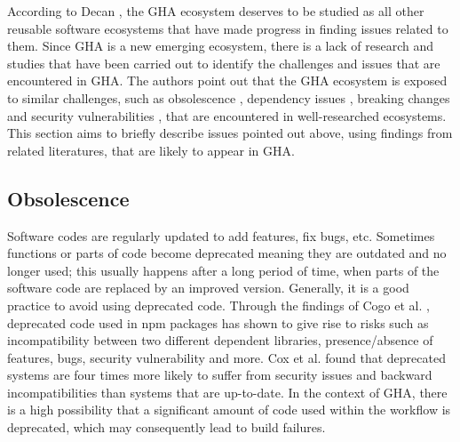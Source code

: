 \documentclass[conference]{IEEEtran}
\begin{document}
	According to Decan \cite{decan2022use}, the GHA ecosystem deserves to be studied as all other reusable software ecosystems that have made progress in finding issues related to them. Since GHA is a new emerging ecosystem, there is a lack of research and studies that have been carried out to identify the challenges and issues that are encountered in GHA. The authors point out that the GHA ecosystem is exposed to similar challenges, such as obsolescence \cite{decan2018evolution} \cite{cogo2021deprecation}, dependency issues \cite{decan2019empirical} \cite{soto2021comprehensive} \cite{decan2019package}, breaking changes \cite{dietrich2019dependency}\cite{decan2018impact} and security vulnerabilities \cite{zimmermann2019small} \cite{kula2018developers}, that are encountered in well-researched ecosystems. This section aims to briefly describe issues pointed out above, using findings from related literatures, that are likely to appear in GHA.



    \subsection{Obsolescence}
        Software codes are regularly updated to add features, fix bugs, etc. Sometimes functions or parts of code become deprecated meaning they are outdated and no longer used; this usually happens after a long period of time, when parts of the software code are replaced by an improved version. Generally, it is a good practice to avoid using deprecated code. Through the findings of Cogo et al. \cite{cogo2021deprecation}, deprecated code used in npm packages has shown to give rise to risks such as incompatibility between two different dependent libraries, presence/absence of features, bugs, security vulnerability and more. Cox et al. \cite{cox2015measuring} found that deprecated systems are four times more likely to suffer from security issues and backward incompatibilities than systems that are up-to-date. In the context of GHA, there is a high possibility that a significant amount of code used within the workflow is deprecated, which may consequently lead to build failures.
\end{document}
